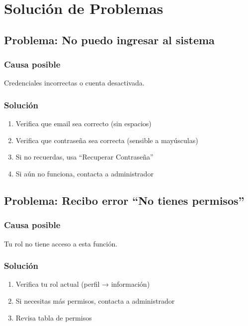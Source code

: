 \documentclass[12pt,a4paper,spanish,oneside]{report}
\begin{document}
\chapter{Solución de Problemas}

\section{Problema: No puedo ingresar al sistema}

\subsection{Causa posible}

Credenciales incorrectas o cuenta desactivada.

\subsection{Solución}

\begin{enumerate}
    \item Verifica que email sea correcto (sin espacios)
    \item Verifica que contraseña sea correcta (sensible a mayúsculas)
    \item Si no recuerdas, usa ``Recuperar Contraseña''
    \item Si aún no funciona, contacta a administrador
\end{enumerate}

\section{Problema: Recibo error ``No tienes permisos''}

\subsection{Causa posible}

Tu rol no tiene acceso a esta función.

\subsection{Solución}

\begin{enumerate}
    \item Verifica tu rol actual (perfil → información)
    \item Si necesitas más permisos, contacta a administrador
    \item Revisa tabla de permisos
\end{enumerate}
\end{document}
